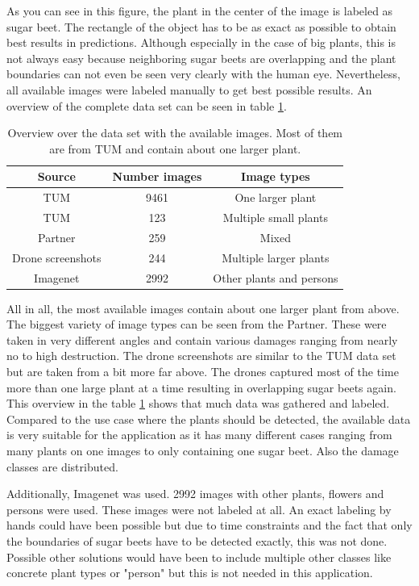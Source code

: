 As you can see in this figure, the plant in the center of the image is labeled as sugar beet. The rectangle of the object has to be as exact as possible to obtain best results in predictions. Although especially in the case of big plants, this is not always easy because neighboring sugar beets are overlapping and the plant boundaries can not even be seen very clearly with the human eye. Nevertheless, all available images were labeled manually to get best possible results. An overview of the complete data set can be seen in table \ref{tab:dataset}.

\begin{table}[h!]
	\centering
	\begin{tabular}{|c c c|} 
		\hline
		Source & Number images & Image types \\ %
		\hline\hline
		TUM & 9461 & One larger plant \\
		TUM & 123 & Multiple small plants \\
		Partner & 259 & Mixed \\
		Drone screenshots & 244 & Multiple larger plants \\
		Imagenet & 2992 & Other plants and persons \\
		\hline
	\end{tabular}
	\caption{Overview over the data set with the available images. Most of them are from TUM and contain about one larger plant.}
	\label{tab:dataset}
\end{table}

All in all, the most available images contain about one larger plant from above. The biggest variety of image types can be seen from the Partner. These were taken in very different angles and contain various damages ranging from nearly no to high destruction. The drone screenshots are similar to the TUM data set but are taken from a bit more far above. The drones captured most of the time more than one large plant at a time resulting in overlapping sugar beets again. This overview in the table \ref{tab:dataset} shows that much data was gathered and labeled. Compared to the use case where the plants should be detected, the available data is very suitable for the application as it has many different cases ranging from many plants on one images to only containing one sugar beet. Also the damage classes are distributed.

Additionally, Imagenet was used. 2992 images with other plants, flowers and persons were used. These images were not labeled at all. An exact labeling by hands could have been possible but due to time constraints and the fact that only the boundaries of sugar beets have to be detected exactly, this was not done. Possible other solutions would have been to include multiple other classes like concrete plant types or "person" but this is not needed in this application.

